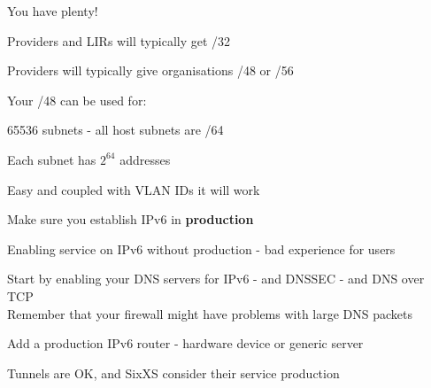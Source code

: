 \documentclass[28pt,landscape,a4paper,footrule]{foils}
\begin{document}

\begin{list1}
\item You have plenty!
\item Providers and LIRs will typically get /32
\item Providers will typically give organisations /48 or /56
\item Your /48 can be used for:
\begin{list2}
\item 65536 subnets - all host subnets are /64
\item Each subnet has $2^{64}$ addresses
\end{list2}
\end{list1}



{\footnotesize {}}



\centerline{Easy and coupled with VLAN IDs it will work \smiley}


\begin{list1}
\item Make sure you establish IPv6 in {\bf production}
\item Enabling service on IPv6 without production - bad experience for users
\item Start by enabling your DNS servers for IPv6 - and DNSSEC - and DNS over TCP\\
Remember that your firewall might have problems with large DNS packets
\item Add a production IPv6 router - hardware device or generic server
\item Tunnels are OK, and SixXS consider their service production
\end{list1}

\end{document}
